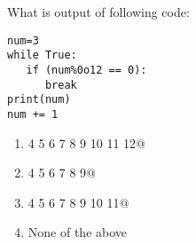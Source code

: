 \question
What is output of following code:

\begin{lstlisting}
num=3
while True:
   if (num%0o12 == 0):
      break
print(num)
num += 1
\end{lstlisting}

\begin{enumerate}
\item {} 4 5 6 7 8 9 10 11 12@
\item {} 4 5 6 7 8 9@
\item {} 4 5 6 7 8 9 10 11@
\item None of the above
\end{enumerate}

